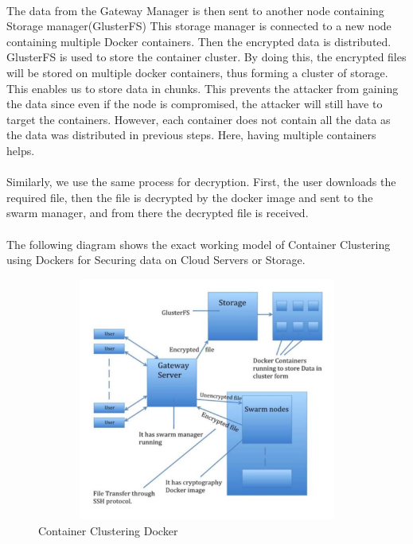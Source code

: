 \paragraph{\hspace{24pt}}
The data from the Gateway Manager is then sent to another node containing Storage manager(GlusterFS) This storage manager is connected to a new node containing multiple Docker containers. Then the encrypted data is distributed. GlusterFS is used to store the container cluster. By doing this, the encrypted files will be stored on multiple docker containers, thus forming a cluster of storage. This enables us to store data in chunks. This prevents the attacker from gaining the data since even if the node is compromised, the attacker will still have to target the containers. However, each container does not contain all the data as the data was distributed in previous steps. Here, having multiple containers helps.

\paragraph{\hspace{24pt}}
Similarly, we use the same process for decryption. First, the user downloads the required file, then the file is decrypted by the docker image and sent to the swarm manager, and from there the decrypted file is received.

\paragraph{\hspace{24pt}}
The following diagram shows the exact working model of Container Clustering using Dockers for Securing data on Cloud Servers or Storage.

\begin{figure}[htb]
\centering
\includegraphics[width=12cm,height=8cm]{5-contents/3-what-is-docker-relation-between-cloud-computing-and-docker/images/container-clustering-docker.png} %
\caption{Container Clustering Docker}
\label{fig:label} %
\end{figure}

